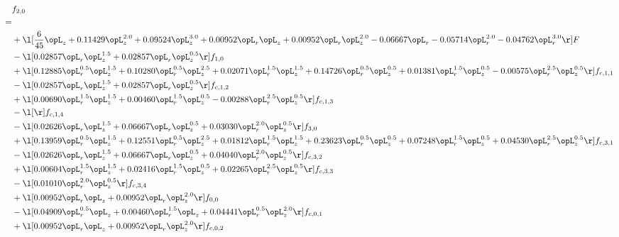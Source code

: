 \begin{alignat}{2} 
\label{eq:f_20_1} 
& f_{2,0} \nonumber \\ 
 = \\ 
& + \l[ \frac{6}{45} \opL_z +  0.11429 \opL_z^{2.0} +  0.09524 \opL_z^{3.0} +  0.00952 \opL_r \opL_z +  0.00952 \opL_r \opL_z^{2.0}   -0.06667 \opL_r   -0.05714 \opL_r^{2.0}   -0.04762 \opL_r^{3.0}  \r] F \nonumber \\ 
& - \l[  0.02857 \opL_r \opL_z^{1.5} +  0.02857 \opL_r \opL_z^{0.5}  \r] f_{1,0} \nonumber \\ 
& + \l[  0.12885 \opL_r^{0.5} \opL_z^{1.5} +  0.10280 \opL_r^{0.5} \opL_z^{2.5} +  0.02071 \opL_r^{1.5} \opL_z^{1.5} +  0.14726 \opL_r^{0.5} \opL_z^{0.5} +  0.01381 \opL_r^{1.5} \opL_z^{0.5}   -0.00575 \opL_r^{2.5} \opL_z^{0.5}  \r] f_{c,1,1} \nonumber \\ 
& - \l[  0.02857 \opL_r \opL_z^{1.5} +  0.02857 \opL_r \opL_z^{0.5}  \r] f_{c,1,2} \nonumber \\ 
& + \l[  0.00690 \opL_r^{1.5} \opL_z^{1.5} +  0.00460 \opL_r^{1.5} \opL_z^{0.5}   -0.00288 \opL_r^{2.5} \opL_z^{0.5}  \r] f_{c,1,3} \nonumber \\ 
& - \l[  \r] f_{c,1,4} \nonumber \\ 
& - \l[  0.02626 \opL_r \opL_z^{1.5} +  0.06667 \opL_r \opL_z^{0.5} +  0.03030 \opL_r^{2.0} \opL_z^{0.5}  \r] f_{3,0} \nonumber \\ 
& + \l[  0.13959 \opL_r^{0.5} \opL_z^{1.5} +  0.12551 \opL_r^{0.5} \opL_z^{2.5} +  0.01812 \opL_r^{1.5} \opL_z^{1.5} +  0.23623 \opL_r^{0.5} \opL_z^{0.5} +  0.07248 \opL_r^{1.5} \opL_z^{0.5} +  0.04530 \opL_r^{2.5} \opL_z^{0.5}  \r] f_{c,3,1} \nonumber \\ 
& - \l[  0.02626 \opL_r \opL_z^{1.5} +  0.06667 \opL_r \opL_z^{0.5} +  0.04040 \opL_r^{2.0} \opL_z^{0.5}  \r] f_{c,3,2} \nonumber \\ 
& + \l[  0.00604 \opL_r^{1.5} \opL_z^{1.5} +  0.02416 \opL_r^{1.5} \opL_z^{0.5} +  0.02265 \opL_r^{2.5} \opL_z^{0.5}  \r] f_{c,3,3} \nonumber \\ 
& - \l[  0.01010 \opL_r^{2.0} \opL_z^{0.5}  \r] f_{c,3,4} \nonumber \\ 
& + \l[  0.00952 \opL_r \opL_z +  0.00952 \opL_r \opL_z^{2.0}  \r] f_{0,0} \nonumber \\ 
& - \l[  0.04909 \opL_r^{0.5} \opL_z +  0.00460 \opL_r^{1.5} \opL_z +  0.04441 \opL_r^{0.5} \opL_z^{2.0}  \r] f_{c,0,1} \nonumber \\ 
& + \l[  0.00952 \opL_r \opL_z +  0.00952 \opL_r \opL_z^{2.0}  \r] f_{c,0,2} \nonumber \\ 

\end{alignat}
